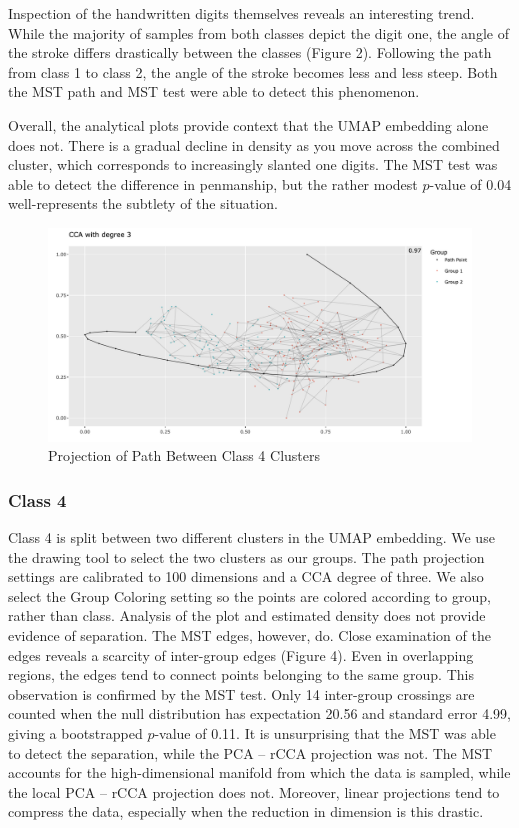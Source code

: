 \documentclass{article}
\begin{document}
Inspection of the handwritten digits themselves reveals an interesting trend. While the majority of samples from both classes depict the digit one, the angle of the stroke differs drastically between the classes (Figure 2). Following the path from class 1 to class 2, the angle of the stroke becomes less and less steep. Both the MST path and MST test were able to detect this phenomenon.

Overall, the analytical plots provide context that the UMAP embedding alone does not. There is a gradual decline in density as you move across the combined cluster, which corresponds to increasingly slanted one digits. The MST test was able to detect the difference in penmanship, but the rather modest $p$-value of 0.04 well-represents the subtlety of the situation.

\renewcommand{\figurename}{Figure}
\renewcommand{\thefigure}{4}
\begin{figure}[!b]
\centering
\includegraphics[scale=0.35]{class 4 projection MNIST}
\caption{Projection of Path Between Class 4 Clusters}
\end{figure}

\subsubsection{Class 4}
Class 4 is split between two different clusters in the UMAP embedding. We use the drawing tool to select the two clusters as our groups. The path projection settings are calibrated to 100 dimensions and a CCA degree of three. We also select the Group Coloring setting so the points are colored according to group, rather than class. Analysis of the plot and estimated density does not provide evidence of separation. The MST edges, however, do. Close examination of the edges reveals a scarcity of inter-group edges (Figure 4). Even in overlapping regions, the edges tend to connect points belonging to the same group. This observation is confirmed by the MST test. Only 14 inter-group crossings are counted when the null distribution has expectation 20.56 and standard error 4.99, giving a bootstrapped $p$-value of 0.11. It is unsurprising that the MST was able to detect the separation, while the PCA -- rCCA projection was not. The MST accounts for the high-dimensional manifold from which the data is sampled, while the local PCA -- rCCA projection does not. Moreover, linear projections tend to compress the data, especially when the reduction in dimension is this drastic.
\end{document}
